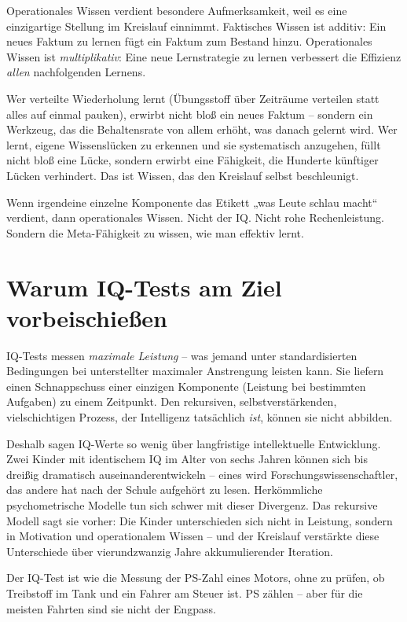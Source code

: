 \documentclass[11pt, twoside, openright]{book}
\begin{document}
Operationales Wissen verdient besondere Aufmerksamkeit, weil es eine einzigartige Stellung im Kreislauf einnimmt. Faktisches Wissen ist additiv: Ein neues Faktum zu lernen fügt ein Faktum zum Bestand hinzu. Operationales Wissen ist \textit{multiplikativ}: Eine neue Lernstrategie zu lernen verbessert die Effizienz \textit{allen} nachfolgenden Lernens.

Wer verteilte Wiederholung lernt (Übungsstoff über Zeiträume verteilen statt alles auf einmal pauken), erwirbt nicht bloß ein neues Faktum -- sondern ein Werkzeug, das die Behaltensrate von allem erhöht, was danach gelernt wird. Wer lernt, eigene Wissenslücken zu erkennen und sie systematisch anzugehen, füllt nicht bloß eine Lücke, sondern erwirbt eine Fähigkeit, die Hunderte künftiger Lücken verhindert. Das ist Wissen, das den Kreislauf selbst beschleunigt.

Wenn irgendeine einzelne Komponente das Etikett „was Leute schlau macht“ verdient, dann operationales Wissen. Nicht der IQ. Nicht rohe Rechenleistung. Sondern die Meta-Fähigkeit zu wissen, wie man effektiv lernt.

\section*{Warum IQ-Tests am Ziel vorbeischießen}

IQ-Tests messen \textit{maximale Leistung} -- was jemand unter standardisierten Bedingungen bei unterstellter maximaler Anstrengung leisten kann. Sie liefern einen Schnappschuss einer einzigen Komponente (Leistung bei bestimmten Aufgaben) zu einem Zeitpunkt. Den rekursiven, selbstverstärkenden, vielschichtigen Prozess, der Intelligenz tatsächlich \textit{ist}, können sie nicht abbilden.

Deshalb sagen IQ-Werte so wenig über langfristige intellektuelle Entwicklung. Zwei Kinder mit identischem IQ im Alter von sechs Jahren können sich bis dreißig dramatisch auseinanderentwickeln -- eines wird Forschungswissenschaftler, das andere hat nach der Schule aufgehört zu lesen. Herkömmliche psychometrische Modelle tun sich schwer mit dieser Divergenz. Das rekursive Modell sagt sie vorher: Die Kinder unterschieden sich nicht in Leistung, sondern in Motivation und operationalem Wissen -- und der Kreislauf verstärkte diese Unterschiede über vierundzwanzig Jahre akkumulierender Iteration.

Der IQ-Test ist wie die Messung der PS-Zahl eines Motors, ohne zu prüfen, ob Treibstoff im Tank und ein Fahrer am Steuer ist. PS zählen -- aber für die meisten Fahrten sind sie nicht der Engpass.
\end{document}
